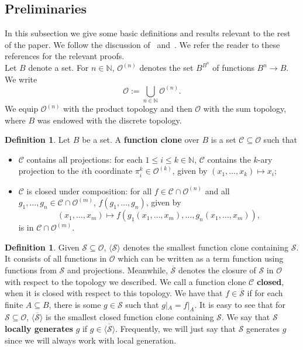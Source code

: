 \documentclass{article}
\theoremstyle{remark}
\theoremstyle{definition}
\newtheorem{definition}[theorem]{Definition}
\begin{document}
\subsection{Preliminaries}\label{sub:prelim}
In this subsection we give some basic definitions and results relevant to the rest of the paper. We follow the discussion of~\cite{szendrei1986clones} and~\cite{BodChen}. We refer the reader to these references for the relevant proofs.\\

Let $B$ denote a set. For $n\in\mathbb{N}$, $\mathcal{O}^{(n)}$ denotes the set $B^{{B}^n}$ of functions  $B^n\to B$. We write
\[\mathcal{O}:=\bigcup_{n\in\mathbb{N}} \mathcal{O}^{(n)}.\]
We equip $\mathcal{O}^{(n)}$ with the product topology and then $\mathcal{O}$ with the sum topology, where $B$ was endowed with the discrete topology.


\begin{definition}\label{def:clone} Let $B$ be a set. A \textbf{function clone} over $B$ is a set $\mathcal{C}\subseteq \mathcal{O}$ such that
\begin{itemize}
    \item $\mathcal{C}$ contains all projections: for each $1\leq i\leq k\in\mathbb{N}$, $\mathcal{C}$ contains the $k$-ary projection to the $i$th coordinate $\pi_{i}^k\in\mathcal{O}^{(k)}$, given by $(x_1, \dots, x_k)\mapsto x_i$;
    \item $\mathcal{C}$ is closed under composition: for all $f\in\mathcal{C}\cap\mathcal{O}^{(n)}$ and all $g_1, \dots, g_n\in \mathcal{C}\cap\mathcal{O}^{(m)}$, $f(g_1, \dots, g_n)$, given by
    \[(x_1, \dots, x_m)\mapsto f(g_1(x_1, \dots, x_m), \dots, g_n(x_1, \dots, x_m)),\]
    is in $\mathcal{C}\cap\mathcal{O}^{(m)}$.
\end{itemize}
\end{definition}

\begin{definition}\label{def:closed} Given $\mathcal{S}\subseteq \mathcal{O}$, $\langle \mathcal{S}\rangle$ denotes the smallest function clone containing $\mathcal{S}$. It consists of all functions in $\mathcal{O}$ which can be written as a term function using functions from $\mathcal{S}$ and projections. Meanwhile, $\overline{\mathcal{S}}$ denotes the closure of $\mathcal{S}$ in $\mathcal{O}$ with respect to the topology we described. We call a function clone $\mathcal{C}$ \textbf{closed}, when it is closed with respect to this  topology. We have that $f\in\overline{\mathcal{S}}$ if for each finite $A\subseteq B$, there is some $g\in\mathcal{S}$ such that $g|_{A}=f|_{A}$. It is easy to see that for $\mathcal{S}\subseteq\mathcal{O}$, $\overline{\langle \mathcal{S}\rangle}$ is the smallest closed function clone containing $\mathcal{S}$. We say that $\mathcal{S}$ \textbf{locally generates} $g$ if $g\in\overline{\langle \mathcal{S}\rangle}$. Frequently, we will just say that $\mathcal{S}$ generates $g$ since we will always work with local generation. 
\end{definition}
\end{document}
